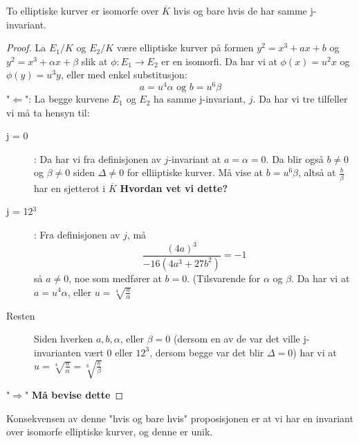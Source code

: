 \begin{proposisjon}
To elliptiske kurver er isomorfe over $\overline{K}$ hvis og bare hvis de har samme j-invariant.

\begin{proof}
La $E_1/K$ og $E_2/K$ være elliptiske kurver på formen $y^2 = x^3 + ax + b$ og $y^2 = x^3 + \alpha x + \beta$ slik at $\phi: E_1 \rightarrow E_2$ er en isomorfi. Da har vi  at $\phi(x) = u^2x$ og $\phi(y) = u^3y$, eller med enkel substitusjon: 
\begin{equation*}
    a = u^4 \alpha \text{ og } b = u^6 \beta 
\end{equation*}
"$\Leftarrow$": La begge kurvene $E_1$ og $E_2$ ha samme j-invariant, $j$. Da har vi tre tilfeller vi må ta hensyn til:
\begin{description}
\item[j = 0]: Da har vi fra definisjonen av $j$-invariant at $a = \alpha = 0$. Da blir også $b \neq 0$ og $\beta \neq 0$ siden $\Delta \neq 0$ for elliiptiske kurver. Må vise at $b = u^6 \beta$, altså at $\frac{b}{\beta}$ har en sjetterot i $\overline{K}$ \textbf{Hvordan vet vi dette?}

\item [j = 12$^3$]: Fra definisjonen av $j$, må 
\begin{equation*}
    \frac{(4a)^3}{-16(4a^3+27b^2)} = -1
\end{equation*}
så $a \neq 0$, noe som medfører at $b = 0$. (Tilsvarende for $\alpha$ og $\beta$. Da har vi at $a = u^4\alpha$, eller $u = \sqrt[4]{\frac{a}{\alpha}}$

\item[Resten] Siden hverken $a, b, \alpha$, eller $\beta = 0$ (dersom en av de var det ville j-invarianten vært $0$ eller $12^3$, dersom begge var det blir $\Delta = 0$) har vi at $u = \sqrt[4]{\frac{a}{\alpha}} = \sqrt[6]{\frac{b}{\beta}}$
\end{description}
"$\Rightarrow$" \textbf{Må bevise dette}
\end{proof}
\end{proposisjon}

Konsekvensen av denne "hvis og bare hvis" proposisjonen er at vi har en invariant over isomorfe elliptiske kurver, og denne er unik.